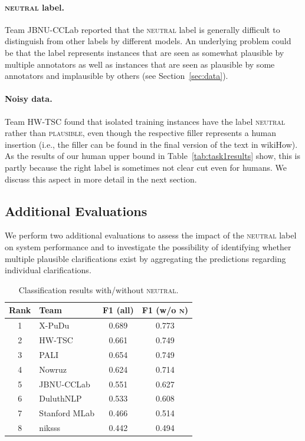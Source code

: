 \documentclass[11pt]{article}
\begin{document}
\paragraph{\textsc{neutral} label.} Team JBNU-CCLab reported that the \textsc{neutral} label is generally difficult to distinguish from other labels by different models. An underlying problem could be that the label represents instances that are seen as somewhat plausible by multiple annotators as well as instances that are seen as plausible by some annotators and implausible by others (see Section~\ref{sec:data}).

\paragraph{Noisy data.} Team HW-TSC found that isolated training instances have the label \textsc{neutral} rather than \textsc{plausible}, even though the respective filler represents a human insertion (i.e., the filler can be found in the final version of the text in wikiHow). As the results of our human upper bound in Table~\ref{tab:task1results} show, this is partly because the right label is sometimes not clear cut even for humans. We discuss this aspect in more detail in the next section. 



\subsection{Additional Evaluations}
\label{subsec:analysis}

We perform two additional evaluations to assess the impact of the \textsc{neutral} label on system performance and to investigate the possibility of identifying whether multiple plausible clarifications exist by aggregating the predictions regarding individual clarifications.

\begin{table}
    \centering
    \begin{tabular}{clcc}
    \toprule
    Rank & Team & F1 (all) & F1 (w/o \textsc{n})\\
    \midrule
    1 & X-PuDu       & 0.689 & 0.773\\ %
    2 & HW-TSC       & 0.661 & 0.749\\
    3 & PALI         & 0.654 & 0.749\\ %
    4 & Nowruz       & 0.624 & 0.714\\
    5 & JBNU-CCLab   & 0.551 & 0.627\\
    6 & DuluthNLP    & 0.533 & 0.608\\
    7 & Stanford MLab& 0.466 & 0.514\\
    8 & niksss       & 0.442 & 0.494\\
 \bottomrule
    \end{tabular}
    \caption{Classification results with/without \textsc{neutral}.}
    \label{tab:noneutral}
\end{table}
\end{document}
